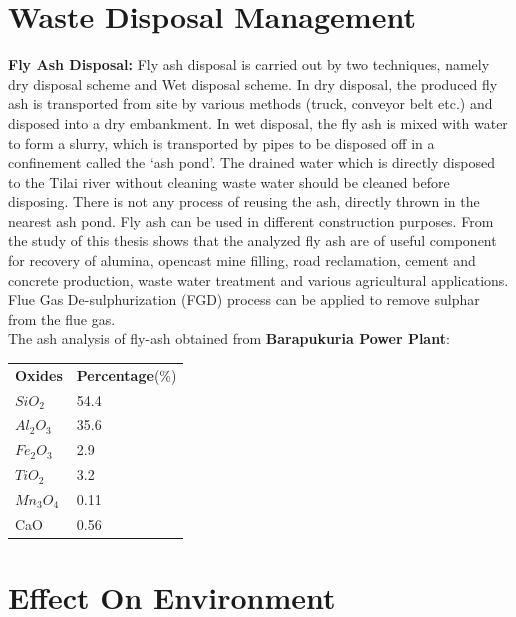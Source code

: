 \documentclass[11 pt]{article}
\begin{document}
\section{Waste Disposal Management}
\hspace{5 mm} \textbf{Fly Ash Disposal: }Fly ash disposal is carried out by two techniques, namely dry disposal scheme and Wet disposal scheme. In dry disposal, the produced fly ash is transported from site by various methods (truck, conveyor belt etc.) and disposed into a dry embankment. In wet disposal, the fly ash is mixed with water to form a slurry, which is transported by pipes to be disposed off in a confinement called the ‘ash pond’. The drained water which is directly disposed to the Tilai river without cleaning waste water should be cleaned before disposing. There is not any process of reusing the ash, directly thrown in the nearest ash pond. Fly ash can be used in different construction purposes. From the study of this thesis shows that the analyzed fly ash are of useful component for recovery of alumina, opencast mine filling, road reclamation, cement and concrete production, waste water treatment and various agricultural applications. Flue Gas De-sulphurization (FGD) process can be applied to remove sulphar from the flue gas.\\
The ash analysis of fly-ash obtained from \textbf{Barapukuria Power Plant}:\\
\begin{center}
	\begin{longtable}{|| m{11 em} || m{11 em} ||}
		\hline\hline
		\rowcolor{cyan!20}
		\multicolumn{2}{c}{\textbf{\textsf{\textcolor{black}{Fly ash analysis}}}}\\
		\hline\hline
			\textbf{Oxides} & \textbf{Percentage}(\%)\\
			$SiO_2$ & 54.4\\
			$Al_2O_3$ & 35.6\\
			$Fe_2O_3$ & 2.9\\
			$TiO_2$ & 3.2\\
			$Mn_3O_4$ & 0.11\\
			CaO & 0.56\\
		\hline\hline
	\end{longtable}
\end{center}

\section{Effect On Environment}
\end{document}
